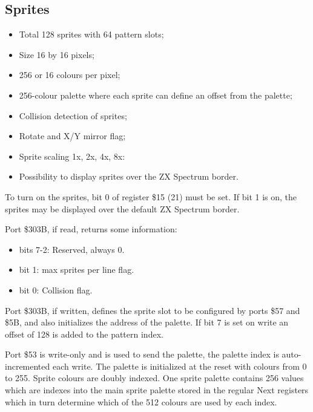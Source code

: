 \subsection{Sprites}
\begin{itemize}
\item Total 128 sprites with 64 pattern slots;
\item Size 16 by 16 pixels;
\item 256 or 16 colours per pixel;
\item 256-colour palette where each sprite can define an offset from
  the palette;
\item Collision detection of sprites;
\item Rotate and X/Y mirror flag;
\item Sprite scaling 1x, 2x, 4x, 8x:
\item Possibility to display sprites over the ZX Spectrum border.
\end{itemize}
To turn on the sprites, bit 0 of register \$15 (21) must be set. If
bit 1 is on, the sprites may be displayed over the default ZX Spectrum
border.

Port \$303B, if read, returns some information:
\begin{itemize}
\item bits 7-2: Reserved, always 0.
\item bit 1: max sprites per line flag.
\item bit 0: Collision flag.
\end{itemize}

Port \$303B, if written, defines the sprite slot to be configured by
ports \$57 and \$5B, and also initializes the address of the
palette. If bit 7 is set on write an offset of 128 is added to the
pattern index.

Port \$53 is write-only and is used to send the palette, the palette
index is auto-incremented each write. The palette is initialized at
the reset with colours from 0 to 255.  Sprite colours are doubly
indexed.  One sprite palette contains 256 values which are indexes
into the main sprite palette stored in the regular Next registers
which in turn determine which of the 512 colours are used by each
index.

